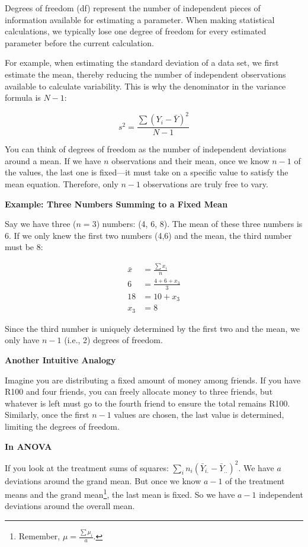\documentclass[
  letterpaper,
]{book}
\begin{document}
Degrees of freedom (df) represent the number of independent pieces of
information available for estimating a parameter. When making
statistical calculations, we typically lose one degree of freedom for
every estimated parameter before the current calculation.

For example, when estimating the standard deviation of a data set, we
first estimate the mean, thereby reducing the number of independent
observations available to calculate variability. This is why the
denominator in the variance formula is \(N-1\):

\[ s^2 = \frac{\sum(Y_i - \bar{Y})^2}{N -1} \]

You can think of degrees of freedom as the number of independent
deviations around a mean. If we have \(n\) observations and their mean,
once we know \(n-1\) of the values, the last one is fixed---it must take
on a specific value to satisfy the mean equation. Therefore, only
\(n-1\) observations are truly free to vary.

\textbf{Example: Three Numbers Summing to a Fixed Mean}

Say we have three (\(n=3\)) numbers: (4, 6, 8). The mean of these three
numbers is 6. If we only knew the first two numbers (4,6) and the mean,
the third number must be 8:

\[
\begin{aligned}
\bar{x} &= \frac{\sum x_i}{n}\\
6 &= \frac{4+6+x_3}{3}\\
18 &= 10 + x_3 \\
x_3 &= 8
\end{aligned}
\]

Since the third number is uniquely determined by the first two and the
mean, we only have \(n-1\) (i.e., 2) degrees of freedom.

\textbf{Another Intuitive Analogy}

Imagine you are distributing a fixed amount of money among friends. If
you have R100 and four friends, you can freely allocate money to three
friends, but whatever is left must go to the fourth friend to ensure the
total remains R100. Similarly, once the first \(n-1\) values are chosen,
the last value is determined, limiting the degrees of freedom.

\textbf{In ANOVA}

If you look at the treatment sums of squares:
\(\sum_i n_i (\bar{Y}_{i.} - \bar{Y}_{..})^2\). We have \(a\) deviations
around the grand mean. But once we know \(a-1\) of the treatment means
and the grand mean\footnote{Remember, \(\mu = \frac{\sum \mu_i}{a}\).},
the last mean is fixed. So we have \(a-1\) independent deviations around
the overall mean.
\end{document}
